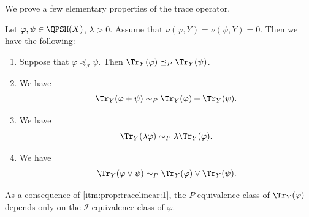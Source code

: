 We prove a few elementary properties of the trace operator.
\begin{proposition}\label{prop:tracelinear}
    Let $\varphi,\psi\in \QPSH(X)$, $\lambda>0$. Assume that $\nu(\varphi,Y)=\nu(\psi,Y)=0$.
    Then we have the following:
    \begin{enumerate}
        \item\label{itm:prop:tracelinear:1} Suppose that $\varphi\preceq_{\mathcal{I}}\psi$. Then $\Tr_Y(\varphi)\preceq_P \Tr_Y(\psi)$.
        \item\label{itm:prop:tracelinear:2} We have
            \[
                \Tr_Y(\varphi+\psi)\sim_P \Tr_Y(\varphi)+\Tr_Y(\psi).
            \]
        \item\label{itm:prop:tracelinear:3} We have
            \[
                \Tr_Y(\lambda\varphi)\sim_P \lambda\Tr_Y(\varphi).
            \]
        \item\label{itm:prop:tracelinear:4} We have
            \[
                \Tr_Y(\varphi\lor \psi)\sim_P \Tr_Y(\varphi)\lor \Tr_Y(\psi).
            \]
    \end{enumerate}
\end{proposition}
As a consequence of \ref{itm:prop:tracelinear:1}, the $P$-equivalence class of $\Tr_Y(\varphi)$ depends only on the $\mathcal{I}$-equivalence class of $\varphi$.
